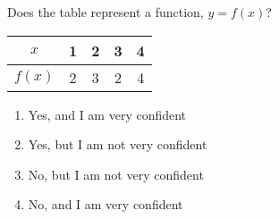 \bigskip

\item Does the table represent a function, $y = f (x)$?

\begin{tabular}{|c|c|c|c|c|}
\hline
$x$ & 1 & 2 & 3 & 4 \\
\hline
$f(x)$ & 2 & 3 & 2 & 4 \\
\hline
\end{tabular}

\begin{enumerate}
\item Yes, and I am very confident  
\item Yes, but I am not very confident
\item No, but I am not very confident
\item No, and I am very confident  
\end{enumerate}

